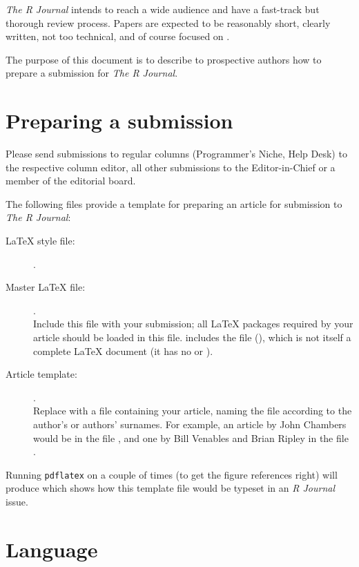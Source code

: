 \emph{The R Journal} intends to reach a wide audience and have a fast-track
but thorough review process. Papers are expected to be reasonably short,
clearly written, not too technical, and of course focused on \R{}.

The purpose of this document is to describe to prospective authors how
to prepare a submission for \emph{The R Journal}.

\section{Preparing a submission}

Please send submissions to regular columns (Programmer's Niche, Help Desk)
to the respective column editor, all other submissions to the Editor-in-Chief
or a member of the editorial board.

The following files provide a template for preparing an article for submission
to \emph{The R Journal}:

\begin{description}

\item[\LaTeX{} style file:] .

\item[Master \LaTeX{} file:] .\\
Include this file with your
submission; all \LaTeX{} packages required by your article should be
loaded in this file.  includes the file
(), which is not itself a complete
\LaTeX{} document (it has no \verb|| or
\verb||).

\item[Article template:] .\\
Replace  with a file containing
your article, naming the file according to the author's or authors' surnames. For example,
an article by John Chambers would be in the file , and
one by Bill Venables and Brian Ripley in the file .

\end{description}

Running {\tt pdflatex} on  a couple of times
(to get the figure references right) will produce
 which shows how this template file would be
typeset in an \emph{R Journal} issue.

\section{Language}

